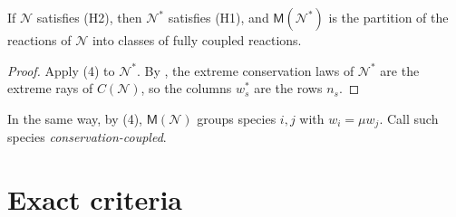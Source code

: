 \documentclass[11pt,a4paper]{report}
\newcommand{\Net}{\mathcal{N}}
\newcommand{\Mips}{\mathsf{M}}
\begin{document}
\begin{proposition}\label{prop:dualmips}
If \(\Net\) satisfies (H2), then \(\Net^*\) satisfies (H1), and \(\Mips(\Net^*)\) is the partition of the reactions of
\(\Net\) into classes of fully coupled reactions.
\end{proposition}
\begin{proof}
Apply (4) to \(\Net^*\). By , the extreme conservation laws of \(\Net^*\) are the
extreme rays of \(C(\Net)\), so the columns \(w^*_s\) are the rows \(n_s\).
\end{proof}

In the same way, by (4), \(\Mips(\Net)\) groups species \(i,j\) with \(w_i=\mu w_j\). Call such
species \emph{conservation-coupled}.

\section{Exact criteria}
\end{document}
